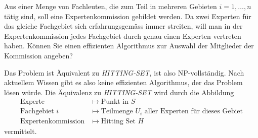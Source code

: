 Aus einer Menge von Fachleuten, die zum Teil in mehreren Gebieten
$i=1,\dots,n$ tätig sind, soll eine Expertenkommission gebildet werden.
Da zwei Experten für das gleiche Fachgebiet sich erfahrungsgemäss
immer streiten, will man in der Expertenkommission jedes Fachgebiet
durch genau einen Experten vertreten haben. Können Sie einen effizienten
Algorithmus zur Auswahl der Mitglieder der Kommission angeben?


\begin{loesung}
Das Problem ist Äquivalent zu \textsl{HITTING-SET}, ist also
NP-vollständig. Nach aktuellem Wissen gibt es also keine
effizienten Algorithmus, der das Problem lösen würde. Die
Äquivalenz zu \textsl{HITTING-SET} wird durch die Abbildung
\begin{align*}
\text{Experte}&\mapsto \text{Punkt in $S$}\\
\text{Fachgebiet $i$}&\mapsto \text{Teilmenge $U_i$ aller Experten für dieses Gebiet}\\
\text{Expertenkommission}&\mapsto \text{Hitting Set $H$}
\end{align*}
vermittelt.
\end{loesung}
